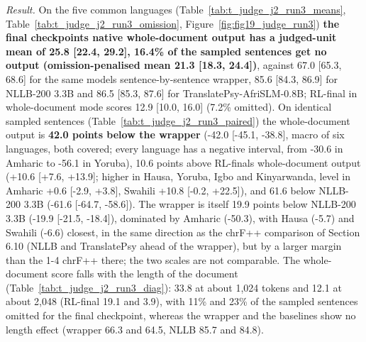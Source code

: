 \emph{Result.} On the five common languages (Table~\ref{tab:t_judge_j2_run3_means}, Table~\ref{tab:t_judge_j2_run3_omission}, Figure~\ref{fig:fig19_judge_run3}) \textbf{the final checkpoint\textquotesingle s native whole-document output has a judged-unit mean of 25.8 {[}22.4, 29.2{]}, 16.4\% of the sampled sentences get no output (omission-penalised mean 21.3 {[}18.3, 24.4{]})}, against 67.0 {[}65.3, 68.6{]} for the same model\textquotesingle s sentence-by-sentence wrapper, 85.6 {[}84.3, 86.9{]} for NLLB-200 3.3B and 86.5 {[}85.3, 87.6{]} for TranslatePsy-AfriSLM-0.8B; RL-final in whole-document mode scores 12.9 {[}10.0, 16.0{]} (7.2\% omitted). On identical sampled sentences (Table~\ref{tab:t_judge_j2_run3_paired}) the whole-document output is \textbf{42.0 points below the wrapper} (-42.0 {[}-45.1, -38.8{]}, macro of six languages, both covered; every language has a negative interval, from -30.6 in Amharic to -56.1 in Yoruba), 10.6 points above RL-final\textquotesingle s whole-document output (+10.6 {[}+7.6, +13.9{]}; higher in Hausa, Yoruba, Igbo and Kinyarwanda, level in Amharic +0.6 {[}-2.9, +3.8{]}, Swahili +10.8 {[}-0.2, +22.5{]}), and 61.6 below NLLB-200 3.3B (-61.6 {[}-64.7, -58.6{]}). The wrapper is itself 19.9 points below NLLB-200 3.3B (-19.9 {[}-21.5, -18.4{]}), dominated by Amharic (-50.3), with Hausa (-5.7) and Swahili (-6.6) closest, in the same direction as the chrF++ comparison of Section 6.10 (NLLB and TranslatePsy ahead of the wrapper), but by a larger margin than the 1-4 chrF++ there; the two scales are not comparable. The whole-document score falls with the length of the document (Table~\ref{tab:t_judge_j2_run3_diag}): 33.8 at about 1,024 tokens and 12.1 at about 2,048 (RL-final 19.1 and 3.9), with 11\% and 23\% of the sampled sentences omitted for the final checkpoint, whereas the wrapper and the baselines show no length effect (wrapper 66.3 and 64.5, NLLB 85.7 and 84.8).

